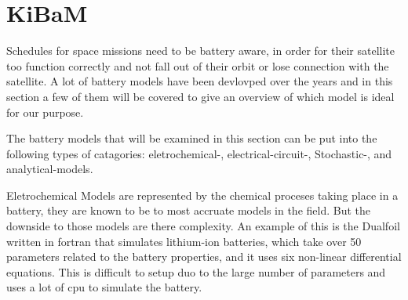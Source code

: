 \section{KiBaM}\label{sec:kibam}
Schedules for space missions need to be battery aware, in order for their satellite too function correctly and not fall out of their orbit or lose connection with the satellite. A lot of battery models have been devlovped over the years and in this section a few of them will be covered to give an overview of which model is ideal for our purpose.

The battery models that will be examined in this section can be put into the following types of catagories: eletrochemical-, electrical-circuit-, Stochastic-, and analytical-models.

Eletrochemical Models are represented by the chemical proceses taking place in a battery, they are known to be to most accruate models in the field. But the downside to those models are there complexity. An example of this is the Dualfoil written in fortran that simulates lithium-ion batteries, which take over 50 parameters related to the battery properties, and it uses six non-linear differential equations. This is difficult to setup duo to the large number of parameters and uses a lot of cpu to simulate the battery.







